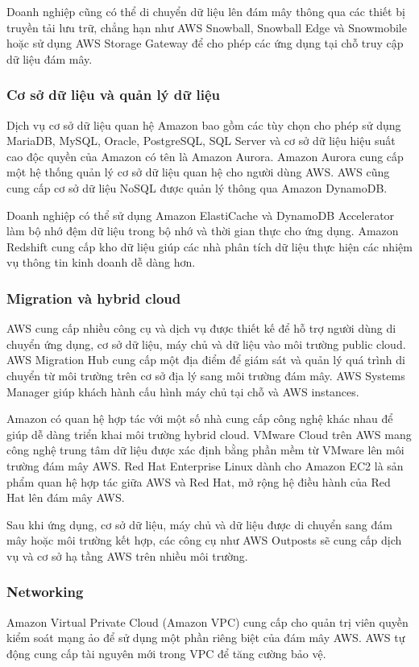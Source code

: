 Doanh nghiệp cũng có thể di chuyển dữ liệu lên đám mây thông qua các thiết bị truyền tải lưu trữ, chẳng hạn như AWS Snowball, Snowball Edge và Snowmobile hoặc sử dụng AWS Storage Gateway để cho phép các ứng dụng tại chỗ truy cập dữ liệu đám mây.

\subsubsection{Cơ sở dữ liệu và quản lý dữ liệu}
Dịch vụ cơ sở dữ liệu quan hệ Amazon bao gồm các tùy chọn cho phép sử dụng MariaDB, MySQL, Oracle, PostgreSQL, SQL Server và cơ sở dữ liệu hiệu suất cao độc quyền của Amazon có tên là Amazon Aurora. Amazon Aurora \cite{aws_aurora_overview} cung cấp một hệ thống quản lý cơ sở dữ liệu quan hệ cho người dùng AWS. AWS cũng cung cấp cơ sở dữ liệu NoSQL được quản lý thông qua Amazon DynamoDB.

Doanh nghiệp có thể sử dụng Amazon ElastiCache \cite{aws_elasticache} và DynamoDB Accelerator làm bộ nhớ đệm dữ liệu trong bộ nhớ và thời gian thực cho ứng dụng. Amazon Redshift cung cấp kho dữ liệu giúp các nhà phân tích dữ liệu thực hiện các nhiệm vụ thông tin kinh doanh dễ dàng hơn.
\subsubsection{Migration và hybrid cloud}
AWS cung cấp nhiều công cụ và dịch vụ được thiết kế để hỗ trợ người dùng di chuyển ứng dụng, cơ sở dữ liệu, máy chủ và dữ liệu vào môi trường public cloud. AWS Migration Hub cung cấp một địa điểm để giám sát và quản lý quá trình di chuyển từ môi trường trên cơ sở địa lý sang môi trường đám mây. AWS Systems Manager giúp khách hành cấu hình máy chủ tại chỗ và AWS instances.

Amazon có quan hệ hợp tác với một số nhà cung cấp công nghệ khác nhau để giúp dễ dàng triển khai môi trường hybrid cloud. VMware Cloud trên AWS mang công nghệ trung tâm dữ liệu được xác định bằng phần mềm từ VMware lên môi trường đám mây AWS. Red Hat Enterprise Linux dành cho Amazon EC2 là sản phẩm quan hệ hợp tác giữa AWS và Red Hat, mở rộng hệ điều hành của Red Hat lên đám mây AWS.

Sau khi ứng dụng, cơ sở dữ liệu, máy chủ và dữ liệu được di chuyển sang đám mây hoặc môi trường kết hợp, các công cụ như AWS Outposts sẽ cung cấp dịch vụ và cơ sở hạ tầng AWS trên nhiều môi trường.
\subsubsection{Networking}
Amazon Virtual Private Cloud \cite{aws_vpc} (Amazon VPC) cung cấp cho quản trị viên quyền kiểm soát mạng ảo để sử dụng một phần riêng biệt của đám mây AWS. AWS tự động cung cấp tài nguyên mới trong VPC để tăng cường bảo vệ.

